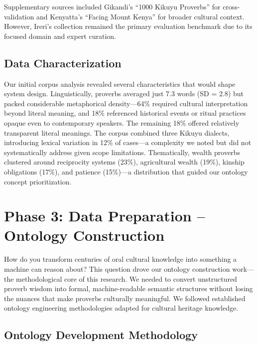 Supplementary sources included Gikandi's ``1000 Kikuyu Proverbs'' \cite{gikandi2005thousand} for cross-validation and Kenyatta's ``Facing Mount Kenya'' \cite{kenyatta1938facing} for broader cultural context. However, Ireri's collection remained the primary evaluation benchmark due to its focused domain and expert curation.

\subsection{Data Characterization}
\label{subsec:data_characterization}

Our initial corpus analysis revealed several characteristics that would shape system design. Linguistically, proverbs averaged just 7.3 words (SD = 2.8) but packed considerable metaphorical density—64\% required cultural interpretation beyond literal meaning, and 18\% referenced historical events or ritual practices opaque even to contemporary speakers. The remaining 18\% offered relatively transparent literal meanings. The corpus combined three Kikuyu dialects, introducing lexical variation in 12\% of cases—a complexity we noted but did not systematically address given scope limitations. Thematically, wealth proverbs clustered around reciprocity systems (23\%), agricultural wealth (19\%), kinship obligations (17\%), and patience (15\%)—a distribution that guided our ontology concept prioritization.

\section{Phase 3: Data Preparation -- Ontology Construction}
\label{sec:phase_ontology}

How do you transform centuries of oral cultural knowledge into something a machine can reason about? This question drove our ontology construction work—the methodological core of this research. We needed to convert unstructured proverb wisdom into formal, machine-readable semantic structures without losing the nuances that make proverbs culturally meaningful. We followed established ontology engineering methodologies \cite{noy2001ontology,suarez2012ontology} adapted for cultural heritage knowledge.

\subsection{Ontology Development Methodology}
\label{subsec:ontology_methodology}

